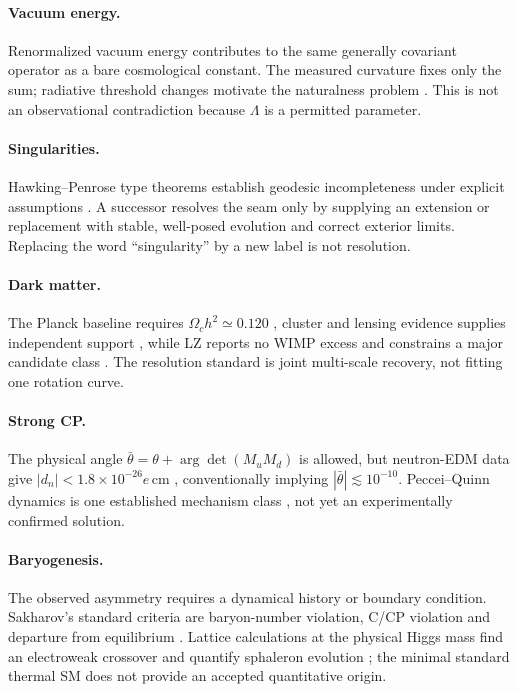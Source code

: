 \documentclass[11pt,a4paper]{article}
\begin{document}
\paragraph{Vacuum energy.}  Renormalized vacuum energy contributes to the same generally covariant operator as a bare cosmological constant.  The measured curvature fixes only the sum; radiative threshold changes motivate the naturalness problem \cite{WeinbergCC1989}.  This is not an observational contradiction because $\Lambda$ is a permitted parameter.

\paragraph{Singularities.}  Hawking--Penrose type theorems establish geodesic incompleteness under explicit assumptions \cite{HawkingPenrose1970}.  A successor resolves the seam only by supplying an extension or replacement with stable, well-posed evolution and correct exterior limits.  Replacing the word ``singularity'' by a new label is not resolution.

\paragraph{Dark matter.}  The Planck baseline requires $\Omega_ch^2\simeq0.120$ \cite{Planck2018}, cluster and lensing evidence supplies independent support \cite{Bullet2006}, while LZ reports no WIMP excess and constrains a major candidate class \cite{LZ2024}.  The resolution standard is joint multi-scale recovery, not fitting one rotation curve.

\paragraph{Strong CP.}  The physical angle $\bar\theta=\theta+\arg\det(M_uM_d)$ is allowed, but neutron-EDM data give $|d_n|<1.8\times10^{-26}e\,\mathrm{cm}$ \cite{nEDM2020}, conventionally implying $|\bar\theta|\lesssim10^{-10}$.  Peccei--Quinn dynamics is one established mechanism class \cite{PQ1977}, not yet an experimentally confirmed solution.

\paragraph{Baryogenesis.}  The observed asymmetry requires a dynamical history or boundary condition.  Sakharov's standard criteria are baryon-number violation, C/CP violation and departure from equilibrium \cite{Sakharov1967}.  Lattice calculations at the physical Higgs mass find an electroweak crossover and quantify sphaleron evolution \cite{Sphaleron2012}; the minimal standard thermal SM does not provide an accepted quantitative origin.
\end{document}
